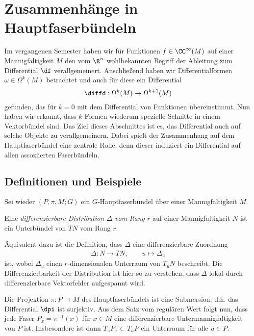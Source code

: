 \documentclass[%
	paper=a5,%
	fleqn,%
	DIV=18,%
	BCOR=0mm,
	fontsize=11pt,
	titlepage=false,%
	bibliography=totoc,
	DIV=18,%
	twoside=true,
	pdftitle=Riemannsche Geometrie,
	pdfauthor=Uwe Semmelmann,
	numbers=noendperiod]%
	{scrbook}
\begin{document}

\chapter{Zusammenhänge in Hauptfaserbündeln}

Im vergangenen Semester haben wir für Funktionen $f\in\CC^\infty(M)$ auf einer
Mannigfaltigkeit $M$ den vom $\R^n$ wohlbekannten Begriff der Ableitung zum
Differential $\df$ verallgemeinert. Anschließend haben wir
Differentialformen $\omega\in\Omega^k(M)$ betrachtet und auch für diese ein
Differential
\begin{align*}
\diffd : \Omega^k(M)\to \Omega^{k+1}(M)
\end{align*}
gefunden, das für $k=0$ mit dem Differential von Funktionen übereinstimmt. Nun
haben wir erkannt, dass $k$-Formen wiederum spezielle Schnitte in einem
Vektorbündel sind. Das Ziel dieses Abschnittes ist es, das Differential auch auf
solche Objekte zu verallgemeinern. Dabei spielt der Zusammenhang auf dem
Hauptfaserbündel eine zentrale Rolle, denn dieser induziert ein
Differential auf allen assoziierten Faserbündeln. 

\section{Definitionen und Beispiele}

Sei wieder $(P,\pi,M;G)$ ein $G$-Hauptfaserbündel über einer Mannigfaltigkeit
$M$.

\begin{defn}
\label{defn:Distribution}
Eine \emph{differenzierbare Distribution $\Delta$ vom Rang $r$} auf einer
Mannigfaltigkeit $N$ ist ein Unterbündel von $TN$ vom Rang $r$.\fish
\end{defn} 

\begin{rem}
Äquivalent dazu ist die Definition, dass $\Delta$ eine differenzierbare
Zuordnung
\begin{align*}
\Delta : N\to TN,\qquad u\mapsto \Delta_u
\end{align*}
ist, wobei $\Delta_u$ einen $r$-dimensionalen Unterraum von $T_uN$ beschreibt.
Die Differenzierbarkeit der Distribution ist hier so zu verstehen, dass $\Delta$
lokal durch differenzierbare Vektorfelder aufgespannt wird.\map
\end{rem}

Die Projektion $\pi: P\to M$ des Hauptfaserbündels ist eine Submersion, d.h. das
Differential $\dpi$ ist surjektiv. Aus dem Satz vom regulären Wert folgt nun,
dass jede Faser $P_x = \pi^{-1}(x)$ für $x\in M$ eine differenzierbare
Untermannigfaltigkeit von $P$ ist. Insbesondere ist dann $T_uP_x\subset T_uP$
ein Unterraum für alle $u\in P$.
\end{document}
